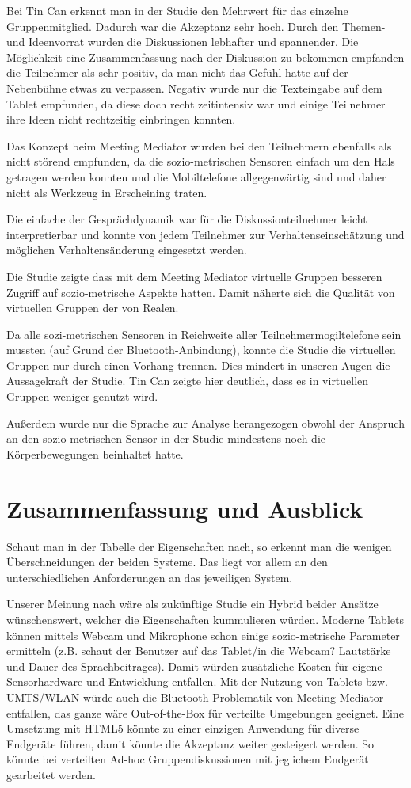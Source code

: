 \documentclass{seminarvorlage}
\begin{document}
Bei Tin Can erkennt man in der Studie den Mehrwert für das einzelne
Gruppenmitglied. Dadurch war die Akzeptanz sehr hoch. Durch den Themen- und
Ideenvorrat wurden die Diskussionen lebhafter und spannender. Die
Mög\-lich\-keit eine Zusammenfassung nach der Diskussion zu bekommen empfanden die Teilnehmer
als sehr positiv, da man nicht das Gefühl hatte auf der Nebenbühne etwas zu
verpassen. Negativ wurde nur die Texteingabe auf dem Tablet empfunden, da diese
doch recht zeitintensiv war und einige Teilnehmer ihre Ideen nicht rechtzeitig
einbringen konnten.

Das Konzept beim Meeting Mediator wurden bei den Teilnehmern ebenfalls als nicht
störend empfunden, da die sozio-metrischen Sensoren einfach um den Hals getragen
werden konnten und die Mobiltelefone allgegenwärtig sind und daher nicht als
Werkzeug in Erscheining traten.

Die einfache der Gesprächdynamik war für die Diskussionteilnehmer leicht
interpretierbar und konnte von jedem Teilnehmer zur Verhaltenseinschätzung und
möglichen Verhaltensänderung eingesetzt werden.

Die Studie zeigte dass mit dem Meeting Mediator virtuelle Gruppen besseren
Zugriff auf sozio-metrische Aspekte hatten. Damit näherte sich  die Qualität von
virtuellen Gruppen der von Realen.

Da alle sozi-metrischen Sensoren in Reichweite aller Teilnehmermogiltelefone
sein mussten (auf Grund der Bluetooth-Anbindung), konnte die Studie die
virtuellen Gruppen nur durch einen Vorhang trennen. Dies mindert in unseren
Augen die Aussagekraft der Studie. Tin Can zeigte hier deutlich, dass es in
virtuellen Gruppen weniger genutzt wird.

Außerdem wurde nur die Sprache zur Analyse herangezogen obwohl der Anspruch an
den sozio-metrischen Sensor in der Studie mindestens noch die Körperbewegungen
beinhaltet hatte.

\section{Zusammenfassung und Ausblick}
Schaut man in der Tabelle der Eigenschaften nach, so erkennt man die wenigen
Überschneidungen der beiden Systeme. Das liegt vor allem an den
unterschiedlichen Anforderungen an das jeweiligen System.

Unserer Meinung nach wäre als zukünftige Studie ein Hybrid beider Ansätze
wünschenswert, welcher die Eigenschaften kummulieren würden. Moderne Tablets
können mittels Webcam und Mikrophone schon einige sozio-metrische Parameter
ermitteln (z.B. schaut der Benutzer auf das Tablet/in die Webcam? Lautstärke
und Dauer des Sprachbeitrages). Damit würden zusätzliche Kosten für eigene
Sensorhardware und Entwicklung entfallen. Mit der Nutzung von Tablets bzw.
UMTS/WLAN würde auch die Bluetooth Problematik von Meeting Mediator entfallen,
das ganze wäre Out-of-the-Box für verteilte Umgebungen geeignet. Eine Umsetzung
mit HTML5 könnte zu einer einzigen Anwendung für diverse Endgeräte führen, damit
könnte die Akzeptanz weiter gesteigert werden. So könnte bei verteilten
Ad-hoc Gruppendiskussionen mit jeglichem Endgerät gearbeitet werden. 
\end{document}
